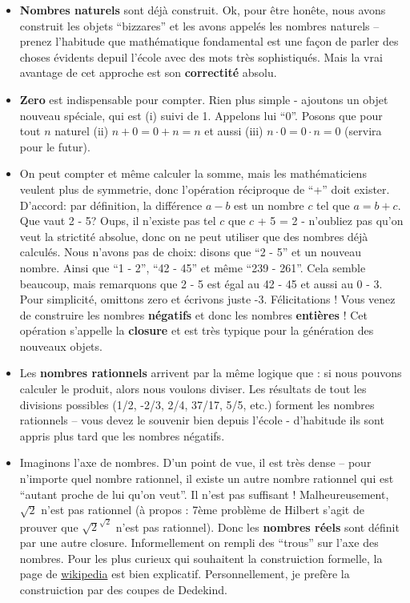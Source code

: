 \documentclass[12pt, a4paper]{article}
\begin{document}
\begin{itemize}
	\item \textbf{Nombres naturels} sont déjà construit. Ok, pour être honête, nous avons construit les objets ``bizzares'' et les avons appelés les nombres naturels -- prenez l'habitude que mathématique fondamental est une façon de parler des choses évidents depuil l'école avec des mots très sophistiqués. Mais la vrai avantage de cet approche est son \textbf{correctité} absolu.
	\item \textbf{Zero} est indispensable pour compter. Rien plus simple - ajoutons un objet nouveau spéciale, qui est (i) suivi de 1. Appelons lui ``0''. Posons que pour tout $n$ naturel (ii) $n + 0 = 0 + n = n$ et aussi (iii) $n \cdot 0 = 0 \cdot n = 0$ (servira pour le futur).
	\item On peut compter et même calculer la somme, mais les mathématiciens veulent plus de symmetrie, donc l'opération réciproque de ``+'' doit exister. D'accord: par définition, la différence $a - b$ est un nombre $c$ tel que $a = b + c$. Que vaut 2 - 5? Oups, il n'existe pas tel $c$ que $c$ + 5 = 2 - n'oubliez pas qu'on veut la strictité absolue, donc on ne peut utiliser que des nombres déjà calculés. Nous n'avons pas de choix: disons que ``2 - 5'' et un nouveau nombre. Ainsi que ``1 - 2'', ``42 - 45'' et même ``239 - 261''. Cela semble beaucoup, mais remarquons que 2 - 5 est égal au 42 - 45 et aussi au 0 - 3. Pour simplicité, omittons zero et écrivons juste -3. Félicitations ! Vous venez de construire les nombres \textbf{négatifs} et donc les nombres \textbf{entières} !
	Cet opération s'appelle la \textbf{closure} et est très typique pour la génération des nouveaux objets.
	\item Les \textbf{nombres rationnels} arrivent par la même logique que : si nous pouvons calculer le produit, alors nous voulons diviser. Les résultats de tout les divisions possibles (1/2, -2/3, 2/4, 37/17, 5/5, etc.) forment les nombres rationnels -- vous devez le souvenir bien depuis l'école - d'habitude ils sont appris plus tard que les nombres négatifs.
	\item Imaginons l'axe de nombres. D'un point de vue, il est très dense -- pour n'importe quel nombre rationnel, il existe un autre nombre rationnel qui est ``autant proche de lui qu'on veut''. Il n'est pas suffisant ! Malheureusement, $\sqrt{2}$ n'est pas rationnel (à propos : 7ème problème de Hilbert s'agit de prouver que $\sqrt2^{\sqrt2}$ n'est pas rationnel).
	Donc les \textbf{nombres réels} sont définit par une autre closure. Informellement on rempli des ``trous'' sur l'axe des nombres.
	Pour les plus curieux qui souhaitent la construiction formelle, la page de
	\href{
		/wiki/Construction_des_nombres_r%
		}{wikipedia} est bien explicatif.
	Personnellement, je prefère la construiction par des coupes de Dedekind.
\end{itemize}
\end{document}
